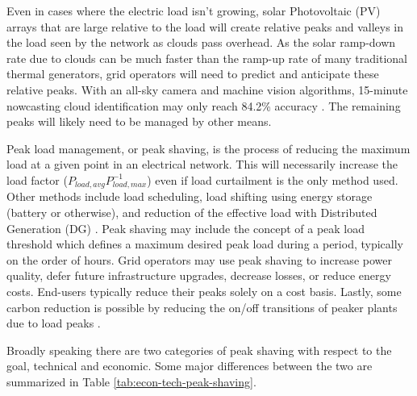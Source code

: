 \documentclass[journal,article,submit,pdftex,moreauthors]{Definitions/mdpi}
\begin{document}
Even in cases where the electric load isn't growing, solar Photovoltaic (PV) arrays that are large relative to the load will create relative peaks and valleys in the load seen by the network as clouds pass overhead. As the solar ramp-down rate due to clouds can be much faster than the ramp-up rate of many traditional thermal generators, grid operators will need to predict and anticipate these relative peaks. With an all-sky camera and machine vision algorithms, 15-minute nowcasting cloud identification may only reach 84.2\% accuracy \cite{Nespoli2022}. The remaining peaks will likely need to be managed by other means.


Peak load management, or peak shaving, is the process of reducing the maximum load at a given point in an electrical network. This will necessarily increase the load factor ($P_{load,avg} P_{load,max}^{-1}$) even if load curtailment is the only method used. Other methods include load scheduling, load shifting using energy storage (battery or otherwise), and reduction of the effective load with Distributed Generation (DG) \cite{Uddin2018}. Peak shaving may include the concept of a peak load threshold which defines a maximum desired peak load during a period, typically on the order of hours. Grid operators may use peak shaving to increase power quality, defer future infrastructure upgrades, decrease losses, or reduce energy costs. End-users typically reduce their peaks solely on a cost basis. Lastly, some carbon reduction is possible by reducing the on/off transitions of peaker plants due to load peaks \cite{Uddin2018}.

Broadly speaking there are two categories of peak shaving with respect to the goal, technical and economic. Some major differences between the two are summarized in Table \ref{tab:econ-tech-peak-shaving}.


\end{document}
